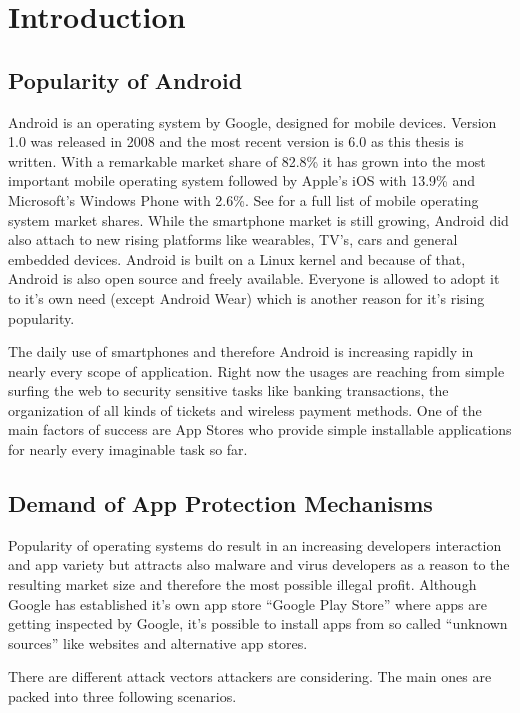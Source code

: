 \chapter{Introduction}\label{chapter:android_status_quo}

\section{Popularity of Android}
Android is an operating system by Google,
designed for mobile devices. Version 1.0 was released
in 2008 and the most recent version is 6.0 as this thesis
is written. With a remarkable market share of 82.8\%
it has grown into the most important mobile operating system
followed by Apple's iOS with 13.9\% and Microsoft's Windows
Phone with 2.6\%. See \parencite{marketshare} for a full list
of mobile operating system market shares. While the smartphone
market is still growing, Android did also attach to new
rising platforms like wearables, TV's, cars and general
embedded devices. Android is built on a Linux kernel
and because of that, Android is also open source and freely
available. Everyone is allowed to adopt it to it's own need
(except Android Wear) which is another reason for it's
rising popularity.

The daily use of smartphones and therefore Android is increasing
rapidly in nearly every scope of application. Right now the usages
are reaching from simple surfing the web to security sensitive tasks
like banking transactions, the organization of all kinds of tickets
and wireless payment methods.
One of the main factors of success are App Stores who provide simple
installable applications for nearly every imaginable task so far.  

\section{Demand of App Protection Mechanisms}
Popularity of operating systems do result in an increasing developers
interaction and app variety but attracts also 
malware and virus developers as a reason to the resulting market
size and therefore the most possible illegal profit.
Although Google has established it's own app store
``Google Play Store'' where apps are getting inspected by Google,
it's possible to install apps from so called ``unknown sources''
like websites and alternative app stores.

There are different attack vectors attackers are considering.
The main ones are packed into three following scenarios.

